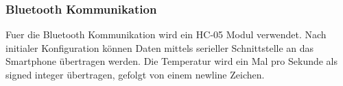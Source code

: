 \documentclass{article}
\begin{document}
  \subsubsection{Bluetooth Kommunikation}
    Fuer die Bluetooth Kommunikation wird ein HC-05 Modul verwendet. Nach initialer
    Konfiguration können Daten mittels serieller Schnittstelle an das Smartphone
    übertragen werden. Die Temperatur wird ein Mal pro Sekunde als signed integer
    übertragen, gefolgt von einem newline Zeichen.

    
    
\end{document}
